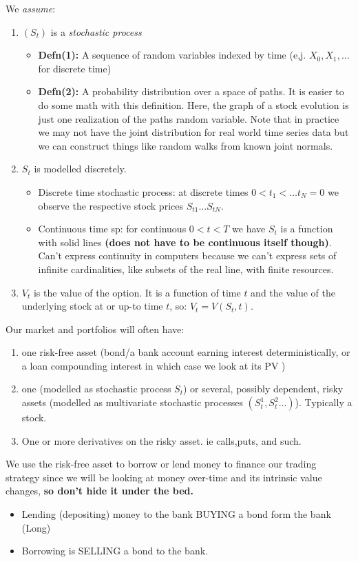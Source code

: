 \documentclass{article}
\begin{document}
We \textit{assume}:

\begin{enumerate}
\item $(S_t)$ is a \textit{stochastic process} 
\begin{itemize}
\item \textbf{Defn(1):} A sequence of random variables indexed by time (e,j. $X_0, X_1, \dots$ for discrete time)
\item \textbf{Defn(2):} A probability distribution over a space of paths. It is easier to do some math with this definition. Here, the graph of a stock evolution is just one realization of the paths random variable. Note that in practice we may not have the joint distribution for real world time series data but we can construct things like random walks from known joint normals. 
\end{itemize}

\item $S_t$ is modelled discretely.
\begin{itemize}
\item Discrete time stochastic process: at discrete times $0 < t_1 < \dots t_N = 0$ we observe the respective stock prices $S_{t1} \dots S_{tN}$.
\item Continuous time sp: for continuous $0 < t < T$ we have $S_t$ is a function with solid lines \textbf{(does not have to be continuous itself though)}. Can't express continuity in computers because we can't express sets of  infinite cardinalities, like subsets of the real line, with finite resources. 
\end{itemize}
\item $V_t$ is the value of the option. It is a function of time $t$ and the value of the underlying stock at or up-to time $t$, so: $V_t = V(S_t,t )$.

\end{enumerate}

Our market and portfolios will often have:
\begin{enumerate}
\item one risk-free asset (bond/a bank account earning interest deterministically, or a loan compounding interest in which case we look at its PV )
\item one (modelled as stochastic process $S_t$) or several, possibly dependent, risky assets (modelled as multivariate stochastic processes $(S_t^1, S_t^2 \dots)$). Typically a stock.
\item One or more derivatives on the risky asset. ie calls,puts, and such. 
\end{enumerate}
We use the risk-free asset to borrow or lend money to finance our trading strategy since we will be looking at money over-time and its intrinsic value changes,  \textbf{so don't hide it under the bed.}
\begin{itemize}
\item Lending (depositing) money to the bank BUYING a bond form the bank (Long)
\item Borrowing is SELLING a bond to the bank. 
\end{itemize} 
\end{document}
